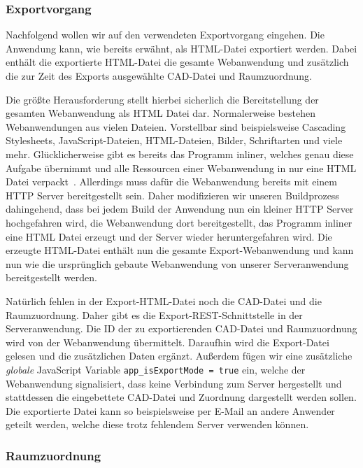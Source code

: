 \subsubsection{Exportvorgang}
\label{subsubsec:export-process}

Nachfolgend wollen wir auf den verwendeten Exportvorgang eingehen.
Die Anwendung kann, wie bereits erwähnt, als HTML-Datei exportiert werden.
Dabei enthält die exportierte HTML-Datei die gesamte Webanwendung und zusätzlich die zur Zeit des Exports ausgewählte CAD-Datei und Raumzuordnung.

Die größte Herausforderung stellt hierbei sicherlich die Bereitstellung der gesamten Webanwendung als HTML Datei dar.
Normalerweise bestehen Webanwendungen aus vielen Dateien.
Vorstellbar sind beispielsweise Cascading Stylesheets, JavaScript-Dateien, HTML-Dateien, Bilder, Schriftarten und viele mehr.
Glücklicherweise gibt es bereits das Programm \glqq{}inliner\grqq{}, welches genau diese Aufgabe übernimmt und alle Ressourcen einer Webanwendung in nur eine HTML Datei verpackt~\cite{Inliner}.
Allerdings muss dafür die Webanwendung bereits mit einem HTTP Server bereitgestellt sein.
Daher modifizieren wir unseren Buildprozess dahingehend, dass bei jedem Build der Anwendung nun ein kleiner HTTP Server hochgefahren wird, die Webanwendung dort bereitgestellt, das Programm \glqq{}inliner\grqq{} eine HTML Datei erzeugt und der Server wieder heruntergefahren wird.
Die erzeugte HTML-Datei enthält nun die gesamte Export-Webanwendung und kann nun wie die ursprünglich gebaute Webanwendung von unserer Serveranwendung bereitgestellt werden.

Natürlich fehlen in der Export-HTML-Datei noch die CAD-Datei und die Raumzuordnung.
Daher gibt es die Export-REST-Schnittstelle in der Serveranwendung.
Die ID der zu exportierenden CAD-Datei und Raumzuordnung wird von der Webanwendung übermittelt.
Daraufhin wird die Export-Datei gelesen und die zusätzlichen Daten ergänzt.
Außerdem fügen wir eine zusätzliche \textit{globale} JavaScript Variable \texttt{app\_isExportMode = true} ein, welche der Webanwendung signalisiert, dass keine Verbindung zum Server hergestellt und stattdessen die eingebettete CAD-Datei und Zuordnung dargestellt werden sollen.
Die exportierte Datei kann so beispielsweise per E-Mail an andere Anwender geteilt werden, welche diese trotz fehlendem Server verwenden können.

\subsubsection{Raumzuordnung}
\label{subsubsec:room-mapping}


